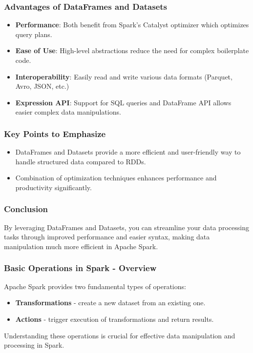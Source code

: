 \documentclass[aspectratio=169]{beamer}
\begin{document}
\begin{frame}
    \frametitle{Advantages of DataFrames and Datasets}
    \begin{itemize}
        \item \textbf{Performance}: Both benefit from Spark's Catalyst optimizer which optimizes query plans.
        \item \textbf{Ease of Use}: High-level abstractions reduce the need for complex boilerplate code.
        \item \textbf{Interoperability}: Easily read and write various data formats (Parquet, Avro, JSON, etc.)
        \item \textbf{Expression API}: Support for SQL queries and DataFrame API allows easier complex data manipulations.
    \end{itemize}
\end{frame}

\begin{frame}
    \frametitle{Key Points to Emphasize}
    \begin{itemize}
        \item DataFrames and Datasets provide a more efficient and user-friendly way to handle structured data compared to RDDs.
        \item Combination of optimization techniques enhances performance and productivity significantly.
    \end{itemize}
\end{frame}

\begin{frame}
    \frametitle{Conclusion}
    By leveraging DataFrames and Datasets, you can streamline your data processing tasks through improved performance and easier syntax, making data manipulation much more efficient in Apache Spark.
\end{frame}

\begin{frame}[fragile]
    \frametitle{Basic Operations in Spark - Overview}
    Apache Spark provides two fundamental types of operations:
    \begin{itemize}
        \item \textbf{Transformations} - create a new dataset from an existing one.
        \item \textbf{Actions} - trigger execution of transformations and return results.
    \end{itemize}
    Understanding these operations is crucial for effective data manipulation and processing in Spark.
\end{frame}
\end{document}
